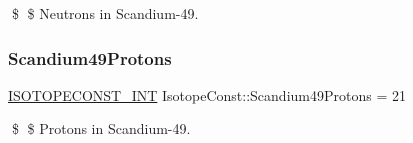 \$ \$ Neutrons in Scandium-\/49. \mbox{\label{group___isotope_const-_scandium-_sc49_gae1c5b3ac51caa324ae8fcacc2a49ecab}} 
\subsubsection{\texorpdfstring{Scandium49\+Protons}{Scandium49Protons}}
{\footnotesize\ttfamily \mbox{\hyperlink{group___isotope_const-_macros_ga5f18360b3e99483a35c32d789e62621c}{I\+S\+O\+T\+O\+P\+E\+C\+O\+N\+S\+T\+\_\+\+I\+NT}} Isotope\+Const\+::\+Scandium49\+Protons = 21}

\$ \$ Protons in Scandium-\/49. 